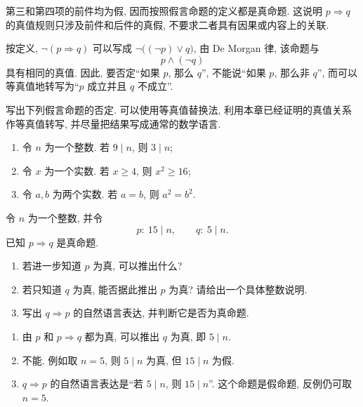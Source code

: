\documentclass[usesamecnt, thmcnt=section, lang=cn, newtx, 10pt, scheme=chinese]{elegantbook}
\begin{document}
\begin{remark}
第三和第四项的前件均为假, 因而按照假言命题的定义都是真命题. 这说明 $p\Rightarrow q$ 的真值规则只涉及前件和后件的真假, 不要求二者具有因果或内容上的关联.
\end{remark}

按定义, $\neg(p\Rightarrow q)$ 可以写成 $\neg\bigl((\neg p)\vee q\bigr)$, 由 De Morgan 律, 该命题与
\[
 p\wedge(\neg q)
\]
具有相同的真值. 因此, 要否定``如果 $p$, 那么 $q$'', 不能说``如果 $p$, 那么非 $q$'', 而可以等真值地转写为``$p$ 成立并且 $q$ 不成立''.

\begin{exercise}
\label{ex:logic-06}
写出下列假言命题的否定. 可以使用等真值替换法, 利用本章已经证明的真值关系作等真值转写, 并尽量把结果写成通常的数学语言.
\begin{enumerate}[label=\rm(\arabic*)]
  \item 令 $n$ 为一个整数. 若 $9\mid n$, 则 $3\mid n$;
  \item 令 $x$ 为一个实数. 若 $x\geq4$, 则 $x^2\geq16$;
  \item 令 $a,b$ 为两个实数. 若 $a=b$, 则 $a^2=b^2$.
\end{enumerate}
\end{exercise}

\begin{concept}
\label{con:logic-06}
令 $n$ 为一个整数, 并令
\[
 p:\ 15\mid n,\qquad q:\ 5\mid n.
\]
已知 $p\Rightarrow q$ 是真命题.
\begin{enumerate}[label=\rm(\arabic*)]
  \item 若进一步知道 $p$ 为真, 可以推出什么?
  \item 若只知道 $q$ 为真, 能否据此推出 $p$ 为真? 请给出一个具体整数说明.
  \item 写出 $q\Rightarrow p$ 的自然语言表达, 并判断它是否为真命题.
\end{enumerate}
\end{concept}

\begin{solution}
\begin{enumerate}[label=\rm(\arabic*)]
  \item 由 $p$ 和 $p\Rightarrow q$ 都为真, 可以推出 $q$ 为真, 即 $5\mid n$.
  \item 不能. 例如取 $n=5$, 则 $5\mid n$ 为真, 但 $15\mid n$ 为假.
  \item $q\Rightarrow p$ 的自然语言表达是``若 $5\mid n$, 则 $15\mid n$''. 这个命题是假命题, 反例仍可取 $n=5$.
\end{enumerate}
\end{solution}
\end{document}
